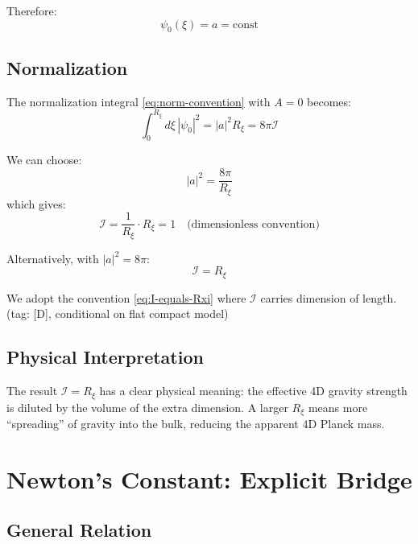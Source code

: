 \documentclass[11pt,a4paper]{article}
\newcommand{\Rxi}{R_\xi}
\newcommand{\calI}{\mathcal{I}}
\begin{document}
Therefore:
\begin{equation}
\psi_0(\xi) = a = \mathrm{const}
\label{eq:flat-zero-mode-sol}
\end{equation}

\subsection{Normalization}

The normalization integral \eqref{eq:norm-convention} with $A = 0$ becomes:
\begin{equation}
\int_0^{\Rxi} d\xi\, |\psi_0|^2 = |a|^2 \Rxi = 8\pi \calI
\label{eq:flat-norm-integral}
\end{equation}

We can choose:
\begin{equation}
|a|^2 = \frac{8\pi}{\Rxi}
\label{eq:a-choice}
\end{equation}
which gives:
\begin{equation}
\calI = \frac{1}{\Rxi} \cdot \Rxi = 1 \quad \text{(dimensionless convention)}
\label{eq:I-dimensionless}
\end{equation}

Alternatively, with $|a|^2 = 8\pi$:
\begin{equation}
\boxed{\calI = \Rxi}
\label{eq:I-equals-Rxi}
\end{equation}

We adopt the convention \eqref{eq:I-equals-Rxi} where $\calI$ carries dimension
of length. \hfill (tag: [D], conditional on flat compact model)

\subsection{Physical Interpretation}

The result $\calI = \Rxi$ has a clear physical meaning: the effective 4D gravity
strength is diluted by the volume of the extra dimension. A larger $\Rxi$ means
more ``spreading'' of gravity into the bulk, reducing the apparent 4D Planck mass.

\section{Newton's Constant: Explicit Bridge}

\subsection{General Relation}
\end{document}
